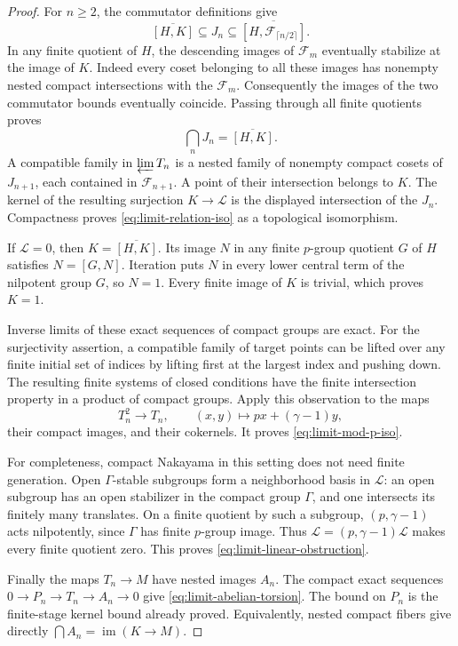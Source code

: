 \documentclass[11pt]{article}
\theoremstyle{definition}\newtheorem{definition}[theorem]{Definition}
\begin{document}
\begin{proof}
For \(n\geq2\), the commutator definitions give
\[
 \overline{[H,K]}\subseteq J_n
 \subseteq\overline{[H,\mathcal F_{\lceil n/2\rceil}]}.
\]
In any finite quotient of \(H\), the descending images of
\(\mathcal F_m\) eventually stabilize at the image of \(K\).
Indeed every coset belonging to all these images has
nonempty nested compact intersections with the \(\mathcal F_m\).
Consequently the images of the two commutator bounds
eventually coincide. Passing through all finite quotients
proves
\[
                    \bigcap_nJ_n=\overline{[H,K]}.
\]
A compatible family in \(\varprojlim T_n\) is a nested family
of nonempty compact cosets of \(J_{n+1}\), each contained
in \(\mathcal F_{n+1}\). A point of their intersection belongs to
\(K\). The kernel of the resulting surjection
\(K\to\mathcal L\) is the displayed intersection of the
\(J_n\). Compactness proves
\eqref{eq:limit-relation-iso} as a topological isomorphism.

If \(\mathcal L=0\), then \(K=\overline{[H,K]}\).
Its image \(N\) in any finite \(p\)-group quotient \(G\)
of \(H\) satisfies \(N=[G,N]\). Iteration puts \(N\)
in every lower central term of the nilpotent group \(G\),
so \(N=1\). Every finite image of \(K\) is trivial,
which proves \(K=1\).

Inverse limits of these exact sequences of compact groups
are exact. For the surjectivity assertion, a compatible
family of target points can be lifted over any finite
initial set of indices by lifting first at the largest
index and pushing down. The resulting finite systems
of closed conditions have the finite intersection
property in a product of compact groups.
Apply this observation to the maps
\[
 T_n^2\longrightarrow T_n,\qquad
 (x,y)\longmapsto px+(\gamma-1)y,
\]
their compact images, and their cokernels. It proves
\eqref{eq:limit-mod-p-iso}.

For completeness, compact Nakayama in this setting does
not need finite generation. Open \(\Gamma\)-stable
subgroups form a neighborhood basis in \(\mathcal L\):
an open subgroup has an open stabilizer in the compact
group \(\Gamma\), and one intersects its finitely many
translates. On a finite quotient by such a subgroup,
\((p,\gamma-1)\) acts nilpotently, since \(\Gamma\)
has finite \(p\)-group image. Thus
\(\mathcal L=(p,\gamma-1)\mathcal L\) makes every
finite quotient zero. This proves
\eqref{eq:limit-linear-obstruction}.

Finally the maps \(T_n\to M\) have nested images \(A_n\).
The compact exact sequences
\(0\to P_n\to T_n\to A_n\to0\) give
\eqref{eq:limit-abelian-torsion}. The bound on \(P_n\)
is the finite-stage kernel bound already proved.
Equivalently, nested compact fibers give directly
\(\bigcap A_n=\operatorname{im}(K\to M)\).
\end{proof}
\end{document}
